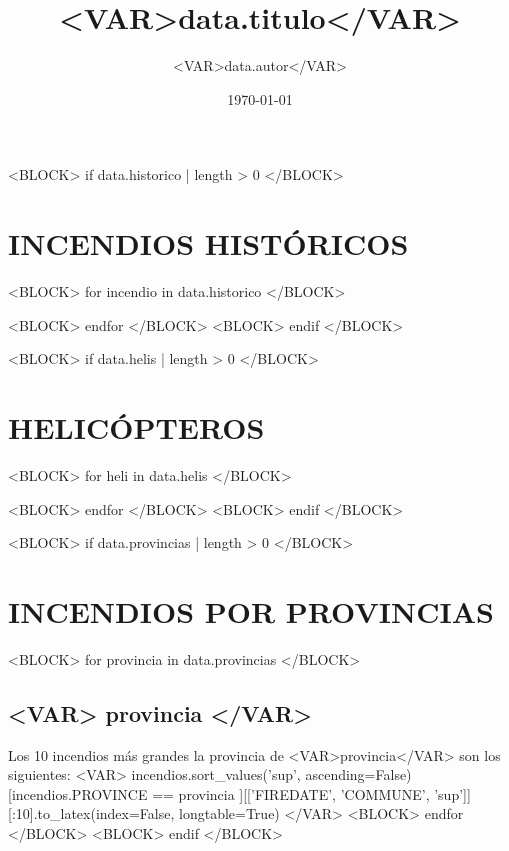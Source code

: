 \documentclass[spanish]{article}
\title{ <VAR>data.titulo</VAR> }
\author{ <VAR>data.autor</VAR> }
\date{\today}
\begin{document}
\maketitle	
\pagebreak

\tableofcontents
\pagebreak


<BLOCK> if data.historico | length > 0 </BLOCK>
\section{INCENDIOS HISTÓRICOS}
<BLOCK> for incendio in data.historico </BLOCK>

<BLOCK> endfor </BLOCK>
<BLOCK> endif </BLOCK>

<BLOCK> if data.helis | length > 0 </BLOCK>
\section{HELICÓPTEROS}
<BLOCK> for heli in data.helis </BLOCK>

<BLOCK> endfor </BLOCK>
<BLOCK> endif </BLOCK>

<BLOCK> if data.provincias | length > 0 </BLOCK>
\section{INCENDIOS POR PROVINCIAS}
<BLOCK> for provincia in data.provincias </BLOCK>
\subsection{<VAR> provincia </VAR>}
Los 10 incendios más grandes la provincia de <VAR>provincia</VAR> son los siguientes:
<VAR> incendios.sort_values('sup', ascending=False)[incendios.PROVINCE == provincia ][['FIREDATE', 'COMMUNE', 'sup']][:10].to_latex(index=False, longtable=True) </VAR>
<BLOCK> endfor </BLOCK>
<BLOCK> endif </BLOCK>
\end{document}
